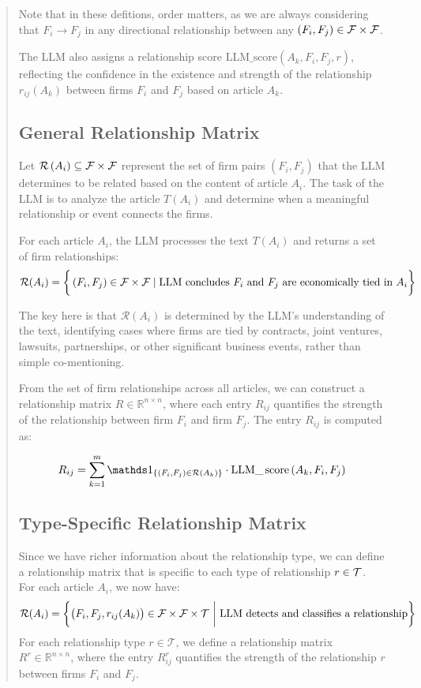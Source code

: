 \begin{quote}
Note that in these defitions, order matters, as we are always considering that $F_i \to F_j$ in any directional relationship between any $(F_i, F_j)\in\mathcal{F}\times\mathcal{F}$. 

The LLM also assigns a relationship score $ \text{LLM\_score}(A_k, F_i, F_j, r) $, reflecting the confidence in the existence and strength of the relationship $ r_{ij}(A_k) $ between firms $ F_i $ and $ F_j $ based on article $ A_k $.

\subsection{General Relationship Matrix}

Let $\mathcal{R}\left(A_i\right) \subseteq \mathcal{F} \times \mathcal{F}$ represent the set of firm pairs $\left(F_i, F_j\right)$ that the LLM determines to be related based on the content of article $A_i$. The task of the LLM is to analyze the article $T\left(A_i\right)$ and determine when a meaningful relationship or event connects the firms.

For each article $A_i$, the LLM processes the text $T\left(A_i\right)$ and returns a set of firm relationships: 
$$
\mathcal{R}(A_i)
=
\bigg{\{} 
\left(F_i, F_j\right) \in \mathcal{F} \times \mathcal{F}
\mid 
\text{LLM concludes $F_i$ and $F_j$ are economically tied in $A_i$}
 \bigg{\}}
$$

The key here is that $\mathcal{R}\left(A_i\right)$ is determined by the LLM's understanding of the text, identifying cases where firms are tied by contracts, joint ventures, lawsuits, partnerships, or other significant business events, rather than simple co-mentioning.

From the set of firm relationships across all articles, we can construct a relationship matrix $R \in \mathbb{R}^{n \times n}$, where each entry $R_{i j}$ quantifies the strength of the relationship between firm $F_i$ and firm $F_j$. The entry $R_{i j}$ is computed as:

$$
R_{i j}
=
\sum_{k=1}^m \I{(F_i, F_j) \in \mathcal{R}(A_k) }
\cdot 
\mathrm{LLM} \_\operatorname{score}\left(A_k, F_i, F_j\right)
$$


\subsection{Type-Specific Relationship Matrix}
Since we have richer information about the relationship type, we can define a relationship matrix that is specific to each type of relationship $r\in\mathcal{T}$. 
For each article $A_i$, we now have: 
$$
\mathcal{R}(A_i)
=
\bigg{\{} 
\big{(} F_i, F_j, r_{ij}(A_k) \big{)} \in \mathcal{F} \times \mathcal{F} \times \mathcal{T}
~\bigg{|}~
\text{LLM detects and classifies a relationship}
 \bigg{\}}
$$
For each relationship type $ r \in \mathcal{T} $, we define a relationship matrix $ R^r \in \mathbb{R}^{n \times n} $, where the entry $ R^r_{ij} $ quantifies the strength of the relationship $ r $ between firms $ F_i $ and $ F_j $.


\end{quote}
